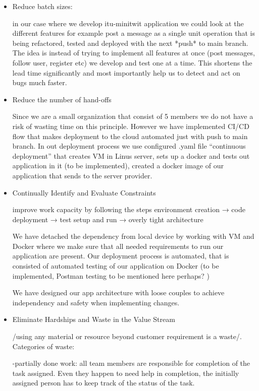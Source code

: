\documentclass{article}
\begin{document}
\begin{itemize}
\item  Reduce batch sizes:

in our case where we develop itu-minitwit application we could look at the different features for example post a message as a single unit operation that is being refactored, tested and deployed with the next *push* to main branch. The idea is instead of  trying to implement all features at once (post messages, follow user, register etc) we develop and test one at a time. This shortens the lead time significantly and most importantly help us to detect and act on bugs much faster.

\item  Reduce the number of hand-offs

Since we are a small organization that consist of 5 members we do not have a risk of wasting time on this principle. However we have implemented CI/CD flow that makes deployment to the cloud automated just with push to main branch. In out deployment process we use configured .yaml file “continuous deployment” that creates VM in Linus server, sets up a docker and tests out application in it (to be implemented), created a docker image of our application that sends to the server provider.

\item Continually Identify and Evaluate Constraints

improve work capacity by following the steps environment creation → code deployment → test setup and run → overly tight architecture

We have detached the dependency from local device by working with VM and Docker where we make sure that all needed requirements to run our application are present. Our deployment process is automated, that is consisted of automated testing of our application on Docker (to be implemented, Postman testing to be mentioned here perhaps? )

We have designed our app architecture with loose couples to achieve independency and safety when implementing changes.

\item Eliminate Hardships and Waste in the Value Stream

/using any material or resource beyond customer requirement is a waste/. Categories of waste: 

-partially done work: all team members are responsible for completion of the task assigned. Even they happen to need help in completion, the initially assigned person has to keep track of the status of the task.


\end{itemize}
\end{document}
